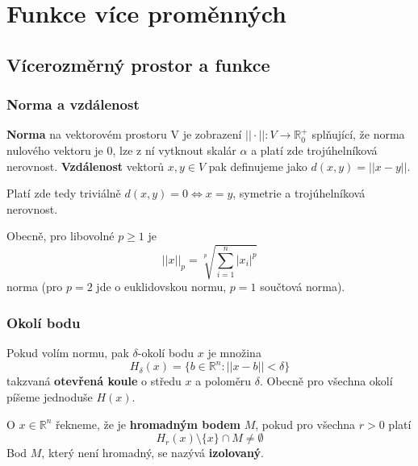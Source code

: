 \section{Funkce více proměnných}

\vspace{12pt}

\subsection{Vícerozměrný prostor a funkce}

\subsubsection{Norma a vzdálenost}

\textbf{Norma} na vektorovém prostoru V je zobrazení $||\cdot|| : V \to \mathbb{R}_0^+$ splňující, že norma nulového vektoru je 0, lze z ní vytknout skalár $\alpha$ a platí zde trojúhelníková nerovnost. \textbf{Vzdálenost} vektorů $x, y \in V$ pak definujeme jako $d(x,y) = ||x - y||$.

\vspace{4pt} \noindent Platí zde tedy triviálně $d(x,y) = 0 \Leftrightarrow x = y$, symetrie a trojúhelníková nerovnost.

\vspace{4pt} \noindent Obecně, pro libovolné $p \geq 1$ je
\begin{equation}
    ||x||_p = \sqrt[p]{\sum_{i=1}^n{|x_i|^p}}
\end{equation}
norma (pro $p = 2$ jde o euklidovskou normu, $p = 1$ součtová norma).

\subsubsection{Okolí bodu}

Pokud volím normu, pak $\delta$-okolí bodu $x$ je množina
\begin{equation}
    H_\delta(x) = \{b \in \mathbb{R}^n: ||x - b|| < \delta\}
\end{equation}
takzvaná \textbf{otevřená koule} o středu $x$ a poloměru $\delta$. Obecně pro všechna okolí píšeme jednoduše $H(x)$.

\vspace{4pt} \noindent O $x \in \mathbb{R}^n$ řekneme, že je \textbf{hromadným bodem} $M$, pokud pro všechna $r > 0$ platí
\begin{equation}
    H_r(x) \setminus \{x\} \cap M \neq \emptyset
\end{equation}
Bod $M$, který není hromadný, se nazývá \textbf{izolovaný}.

